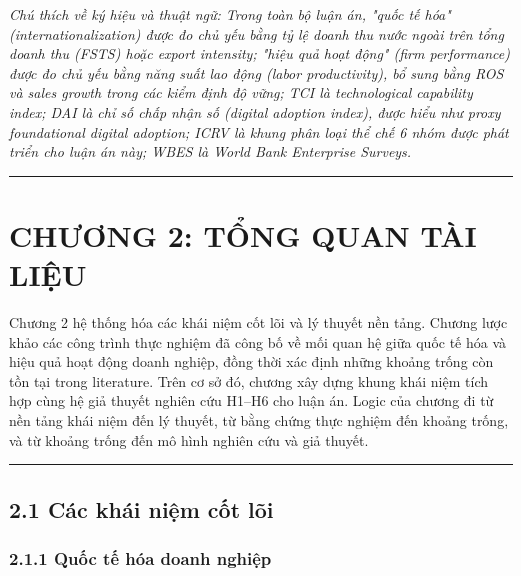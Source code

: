 \documentclass[12pt,a4paper]{article}
\begin{document}
\emph{Chú thích về ký hiệu và thuật ngữ: Trong toàn bộ luận án, "quốc tế
hóa" (internationalization) được đo chủ yếu bằng tỷ lệ doanh thu nước
ngoài trên tổng doanh thu (FSTS) hoặc export intensity; "hiệu quả hoạt
động" (firm performance) được đo chủ yếu bằng năng suất lao động (labor
productivity), bổ sung bằng ROS và sales growth trong các kiểm định độ
vững; TCI là technological capability index; DAI là chỉ số chấp nhận số
(digital adoption index), được hiểu như proxy foundational digital
adoption; ICRV là khung phân loại thể chế 6 nhóm được phát triển cho
luận án này; WBES là World Bank Enterprise Surveys.}

\begin{center}\rule{0.5\linewidth}{0.5pt}\end{center}

\hypertarget{chux1b0ux1a1ng-2-tux1ed5ng-quan-tuxe0i-liux1ec7u}{%
\section{CHƯƠNG 2: TỔNG QUAN TÀI
LIỆU}\label{chux1b0ux1a1ng-2-tux1ed5ng-quan-tuxe0i-liux1ec7u}}

Chương 2 hệ thống hóa các khái niệm cốt lõi và lý thuyết nền tảng.
Chương lược khảo các công trình thực nghiệm đã công bố về mối quan hệ
giữa quốc tế hóa và hiệu quả hoạt động doanh nghiệp, đồng thời xác định
những khoảng trống còn tồn tại trong literature. Trên cơ sở đó, chương
xây dựng khung khái niệm tích hợp cùng hệ giả thuyết nghiên cứu H1--H6
cho luận án. Logic của chương đi từ nền tảng khái niệm đến lý thuyết, từ
bằng chứng thực nghiệm đến khoảng trống, và từ khoảng trống đến mô hình
nghiên cứu và giả thuyết.

\begin{center}\rule{0.5\linewidth}{0.5pt}\end{center}

\hypertarget{21-cuxe1c-khuxe1i-niux1ec7m-cux1ed1t-luxf5i}{%
\subsection{2.1 Các khái niệm cốt
lõi}\label{21-cuxe1c-khuxe1i-niux1ec7m-cux1ed1t-luxf5i}}

\hypertarget{211-quux1ed1c-tux1ebf-huxf3a-doanh-nghiux1ec7p}{%
\subsubsection{2.1.1 Quốc tế hóa doanh
nghiệp}\label{211-quux1ed1c-tux1ebf-huxf3a-doanh-nghiux1ec7p}}
\end{document}
